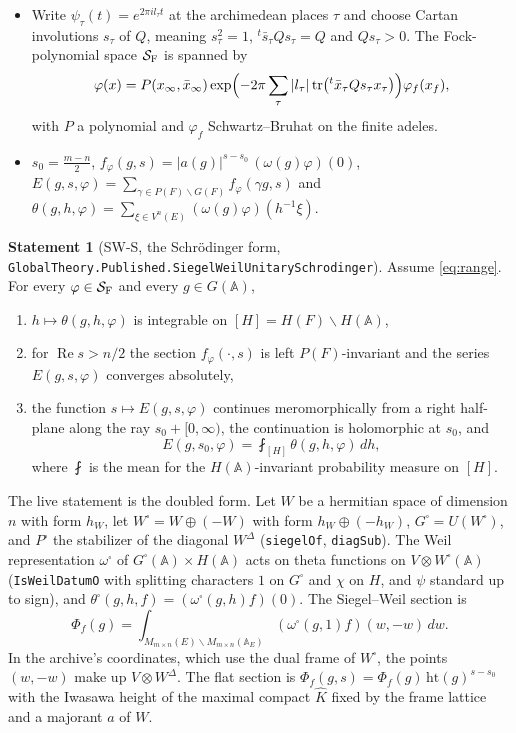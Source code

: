 \documentclass[11pt]{article}
\newcommand{\lean}[1]{\nolinkurl{#1}}
\theoremstyle{definition}
\newtheorem{statement}[lemma]{Statement}
\begin{document}
\begin{itemize}[leftmargin=*]
\item Write $\psi_\tau(t)=e^{2\pi i l_\tau t}$ at the archimedean places $\tau$ and choose Cartan involutions $s_\tau$ of $Q$, meaning $s_\tau^2=1$, ${}^t\bar s_\tau Qs_\tau=Q$ and $Qs_\tau>0$. The Fock-polynomial space $\mathcal S_{\rm F}$ is spanned by
\[
\varphi(x)=P(x_\infty,\bar x_\infty)\exp\Bigl(-2\pi\sum_\tau|l_\tau|\operatorname{tr}\bigl({}^t\bar x_\tau Qs_\tau x_\tau\bigr)\Bigr)\varphi_f(x_f),
\]
with $P$ a polynomial and $\varphi_f$ Schwartz--Bruhat on the finite adeles.
\item $s_0=\frac{m-n}{2}$, $f_\varphi(g,s)=|a(g)|^{s-s_0}\,(\omega(g)\varphi)(0)$, $E(g,s,\varphi)=\sum_{\gamma\in P(F)\backslash G(F)}f_\varphi(\gamma g,s)$ and $\theta(g,h,\varphi)=\sum_{\xi\in V^n(E)}(\omega(g)\varphi)(h^{-1}\xi)$.
\end{itemize}

\begin{statement}[SW-S, the Schr\"odinger form, \lean{GlobalTheory.Published.SiegelWeilUnitarySchrodinger}]\label{st:sws}
Assume \eqref{eq:range}. For every $\varphi\in\mathcal S_{\rm F}$ and every $g\in G(\mathbb A)$,
\begin{enumerate}[label=(\roman*)]
\item $h\mapsto\theta(g,h,\varphi)$ is integrable on $[H]=H(F)\backslash H(\mathbb A)$,
\item for $\operatorname{Re}s>n/2$ the section $f_\varphi(\cdot,s)$ is left $P(F)$-invariant and the series $E(g,s,\varphi)$ converges absolutely,
\item the function $s\mapsto E(g,s,\varphi)$ continues meromorphically from a right half-plane along the ray $s_0+[0,\infty)$, the continuation is holomorphic at $s_0$, and
\begin{equation}\label{eq:sw}
E(g,s_0,\varphi)=\fint_{[H]}\theta(g,h,\varphi)\,dh ,
\end{equation}
where $\fint$ is the mean for the $H(\mathbb A)$-invariant probability measure on $[H]$.
\end{enumerate}
\end{statement}

The live statement is the doubled form. Let $W$ be a hermitian space of dimension $n$ with form $h_W$, let $W^\square=W\oplus(-W)$ with form $h_W\oplus(-h_W)$, $G^\square=U(W^\square)$, and $P^\square$ the stabilizer of the diagonal $W^\Delta$ (\lean{siegelOf}, \lean{diagSub}). The Weil representation $\omega^\square$ of $G^\square(\mathbb A)\times H(\mathbb A)$ acts on theta functions on $V\otimes W^\square(\mathbb A)$ (\lean{IsWeilDatumO} with splitting characters $1$ on $G^\square$ and $\chi$ on $H$, and $\psi$ standard up to sign), and $\theta^\square(g,h,f)=(\omega^\square(g,h)f)(0)$. The Siegel--Weil section is
\[
\Phi_f(g)=\int_{M_{m\times n}(E)\backslash M_{m\times n}(\mathbb A_E)}(\omega^\square(g,1)f)(w,-w)\,dw .
\]
In the archive's coordinates, which use the dual frame of $W^\square$, the points $(w,-w)$ make up $V\otimes W^\Delta$. The flat section is $\Phi_f(g,s)=\Phi_f(g)\,\mathrm{ht}(g)^{s-s_0}$ with the Iwasawa height of the maximal compact $\widehat K$ fixed by the frame lattice and a majorant $a$ of $W$.
\end{document}
